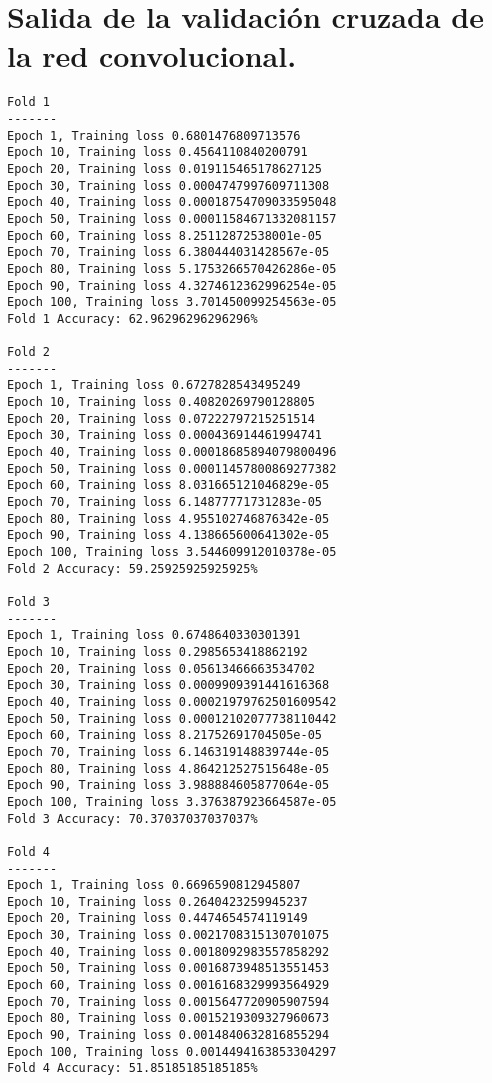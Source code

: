\section{Salida de la validación cruzada de la red convolucional.}
\label{apen:salida-conv}

\begin{verbatim}
Fold 1
-------
Epoch 1, Training loss 0.6801476809713576
Epoch 10, Training loss 0.4564110840200791
Epoch 20, Training loss 0.019115465178627125
Epoch 30, Training loss 0.0004747997609711308
Epoch 40, Training loss 0.00018754709033595048
Epoch 50, Training loss 0.00011584671332081157
Epoch 60, Training loss 8.25112872538001e-05
Epoch 70, Training loss 6.380444031428567e-05
Epoch 80, Training loss 5.1753266570426286e-05
Epoch 90, Training loss 4.3274612362996254e-05
Epoch 100, Training loss 3.701450099254563e-05
Fold 1 Accuracy: 62.96296296296296% 

Fold 2
-------
Epoch 1, Training loss 0.6727828543495249
Epoch 10, Training loss 0.40820269790128805
Epoch 20, Training loss 0.07222797215251514
Epoch 30, Training loss 0.000436914461994741
Epoch 40, Training loss 0.00018685894079800496
Epoch 50, Training loss 0.00011457800869277382
Epoch 60, Training loss 8.031665121046829e-05
Epoch 70, Training loss 6.14877771731283e-05
Epoch 80, Training loss 4.955102746876342e-05
Epoch 90, Training loss 4.138665600641302e-05
Epoch 100, Training loss 3.544609912010378e-05
Fold 2 Accuracy: 59.25925925925925% 

Fold 3
-------
Epoch 1, Training loss 0.6748640330301391
Epoch 10, Training loss 0.2985653418862192
Epoch 20, Training loss 0.05613466663534702
Epoch 30, Training loss 0.0009909391441616368
Epoch 40, Training loss 0.00021979762501609542
Epoch 50, Training loss 0.00012102077738110442
Epoch 60, Training loss 8.21752691704505e-05
Epoch 70, Training loss 6.146319148839744e-05
Epoch 80, Training loss 4.864212527515648e-05
Epoch 90, Training loss 3.988884605877064e-05
Epoch 100, Training loss 3.376387923664587e-05
Fold 3 Accuracy: 70.37037037037037% 

Fold 4
-------
Epoch 1, Training loss 0.6696590812945807
Epoch 10, Training loss 0.2640423259945237
Epoch 20, Training loss 0.4474654574119149
Epoch 30, Training loss 0.0021708315130701075
Epoch 40, Training loss 0.0018092983557858292
Epoch 50, Training loss 0.0016873948513551453
Epoch 60, Training loss 0.0016168329993564929
Epoch 70, Training loss 0.0015647720905907594
Epoch 80, Training loss 0.0015219309327960673
Epoch 90, Training loss 0.0014840632816855294
Epoch 100, Training loss 0.0014494163853304297
Fold 4 Accuracy: 51.85185185185185% 


\end{verbatim}
